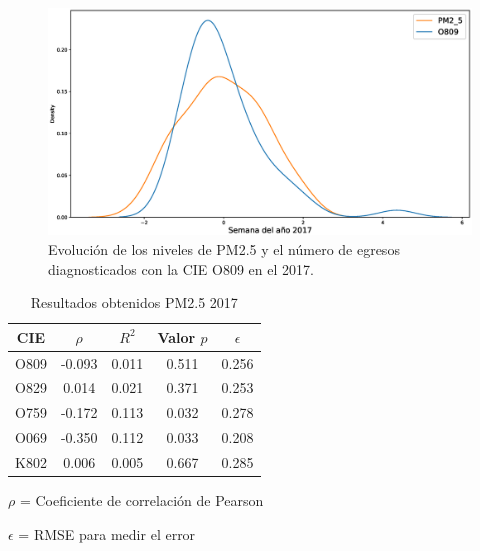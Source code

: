 \begin{figure}[h!]
\setcounter{figure}{4} %
\captionsetup{type=figure} %
\begin{center}
   \includegraphics[width=1\textwidth]{PM2_5_O809_2017.eps}
   \end{center}
    \caption[Series de tiempo 2017 PM2.5 y O809]{Evolución de los niveles de PM2.5 y el número de egresos diagnosticados con la CIE O809 en el 2017.}
    \label{serie_de_tiempo_2017_PM25}
\end{figure}

\begin{table}[hbt!]
\centering
\caption{Resultados obtenidos PM2.5 2017}
\label{tab:Resultados obtenidos PM2.5 2017}
\vspace{0.5cm}
\begin{threeparttable}
\begin{tabular}{|c|c|c|c|c|}
	\hline
	CIE & $\rho$ & $R^2$ & Valor $p$ & $\epsilon$\\
	\hline
	O809 & -0.093 & 0.011 & 0.511 & 0.256 \\
	\hline
	O829 & 0.014 & 0.021 & 0.371 & 0.253 \\
	\hline
	O759 & -0.172 & 0.113 & 0.032 & 0.278 \\
	\hline
	O069 & -0.350 & 0.112 & 0.033 & 0.208 \\
	\hline
	K802 & 0.006 & 0.005 & 0.667 & 0.285 \\
	\hline
\end{tabular}
\begin{tablenotes}
\footnotesize
\item{$\rho$ = Coeficiente de correlación de Pearson}
\item{$\epsilon$ = RMSE para medir el error}
\end{tablenotes}
\end{threeparttable}
\end{table}

